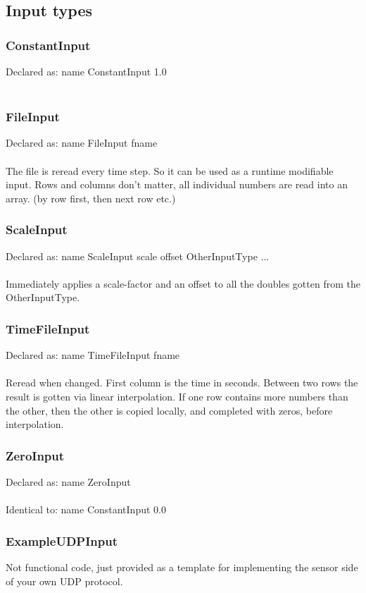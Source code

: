 \documentclass[a4paper]{article}
\begin{document}
\subsection{Input types}
\subsubsection{ConstantInput}
Declared as: name ConstantInput 1.0\\\\
\subsubsection{FileInput}
Declared as: name FileInput fname\\\\
The file is reread every time step. So it can be used as a runtime modifiable input.
Rows and columns don't matter, all individual numbers are read into an array. (by row first, then next row etc.)
\subsubsection{ScaleInput}
Declared as: name ScaleInput scale offset OtherInputType $\ldots$\\\\
Immediately applies a scale-factor and an offset to all the doubles gotten from the OtherInputType.
\subsubsection{TimeFileInput}
Declared as: name TimeFileInput fname\\\\
Reread when changed. First column is the time in seconds. Between two rows the result is gotten via linear interpolation. If one row contains more numbers than the other, then the other is copied locally, and completed with zeros, before interpolation.
\subsubsection{ZeroInput}
Declared as: name ZeroInput\\\\
Identical to: name ConstantInput 0.0
\subsubsection{ExampleUDPInput}
Not functional code, just provided as a template for implementing the sensor side of your own UDP protocol.
\end{document}
